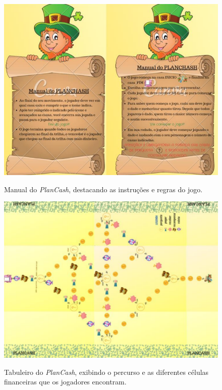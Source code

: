 \begin{figure}[ht]
	\centering
	\caption{Manual do \textit{PlanCash}, destacando as instruções e regras do jogo.}
	\includegraphics[scale=0.45]{Textuais/Pictures/Plancash-1.png}
	\label{fig:plancash-1}
\end{figure}

\begin{figure}[ht]
	\centering
	\caption{Tabuleiro do \textit{PlanCash}, exibindo o percurso e as diferentes células financeiras que os jogadores encontram.}
	\includegraphics[scale=0.45]{Textuais/Pictures/Plancash-2.png}
	\label{fig:plancash-2}
\end{figure}


